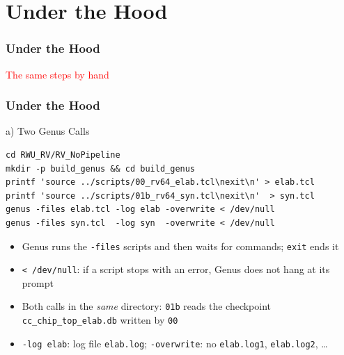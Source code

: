 \documentclass{beamer}
\newcommand{\astitle}{nix}
\newcommand{\assubtitle}{nix}
\newcommand{\cmd}[1]{\texttt{#1}}
\begin{document}
\section{Under the Hood}
\renewcommand{\astitle}{Under the Hood}
\begin{frame}
\frametitle{\astitle}
\textcolor{red}{The same steps by hand}
\end{frame}

\renewcommand{\assubtitle}{a) Two Genus Calls}
\begin{frame}[fragile]
\frametitle{\astitle}
\begin{block}{\assubtitle}
\begin{lstlisting}[style=sh]
cd RWU_RV/RV_NoPipeline
mkdir -p build_genus && cd build_genus
printf 'source ../scripts/00_rv64_elab.tcl\nexit\n' > elab.tcl
printf 'source ../scripts/01b_rv64_syn.tcl\nexit\n'  > syn.tcl
genus -files elab.tcl -log elab -overwrite < /dev/null
genus -files syn.tcl  -log syn  -overwrite < /dev/null
\end{lstlisting}
  \begin{itemize}
    \item Genus runs the \cmd{-files} scripts and then waits for commands;
      \cmd{exit} ends it
    \item \cmd{< /dev/null}: if a script stops with an error, Genus does not
      hang at its prompt
    \item Both calls in the \emph{same} directory: \cmd{01b} reads the
      checkpoint \cmd{cc\_chip\_top\_elab.db} written by \cmd{00}
    \item \cmd{-log elab}: log file \cmd{elab.log}; \cmd{-overwrite}: no
      \cmd{elab.log1}, \cmd{elab.log2}, \dots
  \end{itemize}
\end{block}
\end{frame}
\end{document}
